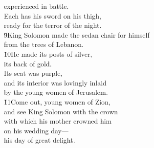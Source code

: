 \begin{poetry}
\poemll    experienced in battle. \\
\poeml Each has his sword on his thigh, \\
\poemll    ready for the terror of the night. \\
\poeml \v{9}King Solomon made the sedan chair for himself \\
\poemll    from the trees of Lebanon. \\
\poeml \v{10}He made its posts of silver, \\
\poemll    its back of gold. \\
\poeml Its seat was purple, \\
\poemll    and its interior was lovingly inlaid \\
\poemlll       by the young women of Jerusalem. \\
\poeml \v{11}Come out, young women of Zion, \\
\poemll    and see King Solomon with the crown \\
\poeml with which his mother crowned him \\
\poemll    on his wedding day--- \\
\poemlll       his day of great delight.
\end{poetry}

